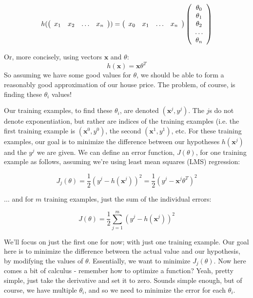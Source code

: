 \documentclass{article}
\begin{document}
\begin{equation}
h( \left( \begin{array}{cccc} x_{1} & x_{2} & \hdots & x_{n} \end{array} \right) ) = \left( \begin{array}{cccc} x_{0} & x_{1} & \hdots & x_{n} \end{array} \right) \left( \begin{array}{ccc} \theta_{0}\cr \theta_{1}\cr \theta_{2}\cr \hdots\cr \theta_{n} \end{array} \right)
\end{equation}

Or, more concisely, using vectors \(\textbf{x}\) and \(\theta\):
\begin{equation}
h(\textbf{x}) = \textbf{x}\theta^{T}
\end{equation}
So assuming we have some good values for \(\theta\), we should be able to form a reasonably good approximation of our house price. The problem, of course, is finding these \(\theta_{i}\) values!

Our training examples, to find these \(\theta_{i}\), are denoted \((\textbf{x}^{j}, y^{j})\). The \(j\)s do not denote exponentiation, but rather are indices of the training examples (i.e. the first training example is \((\textbf{x}^{0}, y^{0})\), the second \((\textbf{x}^{1}, y^{1})\), etc. For these training examples, our goal is to minimize the difference between our hypotheses \(h(\textbf{x}^{j})\) and the \(y^{j}\) we are given. We can define an error function, \(J(\theta)\), for one training example as follows, assuming we're using least mean squares (LMS) regression:

\begin{equation}
J_{j}(\theta) = \frac{1}{2} (y^{j} - h(\textbf{x}^{j}))^{2} = \frac{1}{2} (y^{j} - \textbf{x}^{j}\theta^{T})^2
\end{equation}

\(\hdots\) and for \(m\) training examples, just the sum of the individual errors:

\begin{equation}
J(\theta) = \frac{1}{2} \sum_{j=1}^{m} (y^{j} - h(\textbf{x}^{j}))^{2}
\end{equation}

We'll focus on just the first one for now; with just one training example. Our goal here is to minimize the difference between the actual value and our hypothesis, by modifying the values of \(\theta\). Essentially, we want to minimize \(J_{j}(\theta)\). Now here comes a bit of calculus - remember how to optimize a function? Yeah, pretty simple, just take the derivative and set it to zero. Sounds simple enough, but of course, we have multiple \(\theta_{i}\), and so we need to minimize the error for each \(\theta_{i}\).
\end{document}
